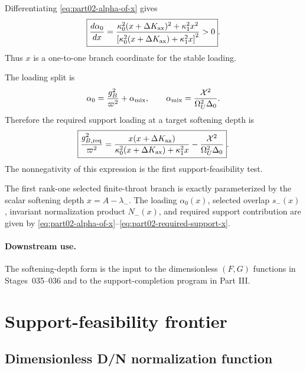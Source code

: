 Differentiating \eqref{eq:part02-alpha-of-x} gives
\begin{equation}
\label{eq:part02-dalpha-dx}
\boxed{
\frac{d\alpha_0}{dx}
=
\frac{\kappa_0^2(x+\Delta K_{\rm ax})^2+\kappa_1^2x^2}
{\left[\kappa_0^2(x+\Delta K_{\rm ax})+\kappa_1^2x\right]^2}>0}.
\end{equation}
Thus \(x\) is a one-to-one branch coordinate for the stable loading.

The loading split is
\begin{equation}
\alpha_0=\frac{g_B^2}{\varpi^2}+\alpha_{\rm mix},
\qquad
\alpha_{\rm mix}=\frac{\mathcal{X}^2}{\Omega_U^2\Delta_0}.
\end{equation}
Therefore the required support loading at a target softening depth is
\begin{equation}
\label{eq:part02-required-support-x}
\boxed{
\frac{g_{B,{\rm req}}^2}{\varpi^2}
=
\frac{x(x+\Delta K_{\rm ax})}
{\kappa_0^2(x+\Delta K_{\rm ax})+\kappa_1^2x}
-
\frac{\mathcal{X}^2}{\Omega_U^2\Delta_0}}.
\end{equation}
The nonnegativity of this expression is the first support-feasibility test.

\begin{theorem}
\label{thm:part02-softening-depth-normal-form}
The first rank-one selected finite-throat branch is exactly parameterized by the scalar softening depth \(x=A-\lambda_-\).  The loading \(\alpha_0(x)\), selected overlap \(s_-(x)\), invariant normalization product \(N_-(x)\), and required support contribution are given by \eqref{eq:part02-alpha-of-x}--\eqref{eq:part02-required-support-x}.
\end{theorem}

\paragraph{Downstream use.}
The softening-depth form is the input to the dimensionless \((F,G)\) functions in Stages~035--036 and to the support-completion program in Part III.

\section{Support-feasibility frontier}
\label{sec:part02_conservative_response:support-feasibility-frontier}

\subsection{Dimensionless D/N normalization function}
\label{subsec:part02-stage035-F}

